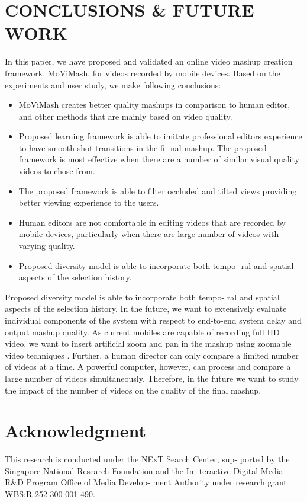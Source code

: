 \documentclass{IEEEtran}
\begin{document}
\section{CONCLUSIONS \& FUTURE WORK}
In this paper, we have proposed and validated an online video
mashup creation framework, MoViMash, for videos recorded by
mobile devices. Based on the experiments and user study, we make
following conclusions:
\begin{itemize}
    \item MoViMash creates better quality mashups in comparison to
human editor, and other methods that are mainly based on
video quality.
    \item Proposed learning framework is able to imitate professional
editor\textquotesingle s experience to have smooth shot transitions in the fi-
nal mashup. The proposed framework is most effective when there are a number of similar visual quality videos to chose
from.
    \item The proposed framework is able to filter occluded and tilted
views providing better viewing experience to the users.
    \item Human editors are not comfortable in editing videos that are
recorded by mobile devices, particularly when there are large
number of videos with varying quality.
    \item Proposed diversity model is able to incorporate both tempo-
ral and spatial aspects of the selection history.
\end{itemize}

Proposed diversity model is able to incorporate both tempo-
ral and spatial aspects of the selection history. In the future, we want to extensively evaluate individual components of the system with respect to end-to-end system delay and output mashup quality. As current mobiles are capable of recording full HD video, we want to insert artificial zoom and pan in the mashup using zoomable video techniques \cite{web:11}. Further, a human director can only compare a limited number of videos at a time.
A powerful computer, however, can process and compare a large number of videos simultaneously. Therefore, in the future we want to study the impact of the number of videos on the quality of the final mashup.

\section*{Acknowledgment}
This research is conducted under the NExT Search Center, sup-
ported by the Singapore National Research Foundation and the In-
teractive Digital Media R\&D Program Office of Media Develop-
ment Authority under research grant WBS:R-252-300-001-490.

\printbibliography
%
%
\end{document}

